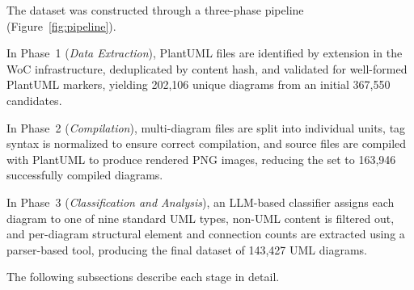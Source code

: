 \documentclass[data,datadescriptor,submit,pdftex,moreauthors]{Definitions/mdpi}
\begin{document}
The dataset was constructed through a three-phase pipeline (Figure~\ref{fig:pipeline}).

In Phase~1 (\emph{Data Extraction}), PlantUML files are identified by extension in the WoC infrastructure, deduplicated by content hash, and validated for well-formed PlantUML markers, yielding 202,106 unique diagrams from an initial 367,550 candidates.

In Phase~2 (\emph{Compilation}), multi-diagram files are split into individual units, tag syntax is normalized to ensure correct compilation, and source files are compiled with PlantUML to produce rendered PNG images, reducing the set to 163,946 successfully compiled diagrams.

In Phase~3 (\emph{Classification and Analysis}), an LLM-based classifier assigns each diagram to one of nine standard UML types, non-UML content is filtered out, and per-diagram structural element and connection counts are extracted using a parser-based tool, producing the final dataset of 143,427 UML diagrams.

The following subsections describe each stage in detail.
\end{document}
